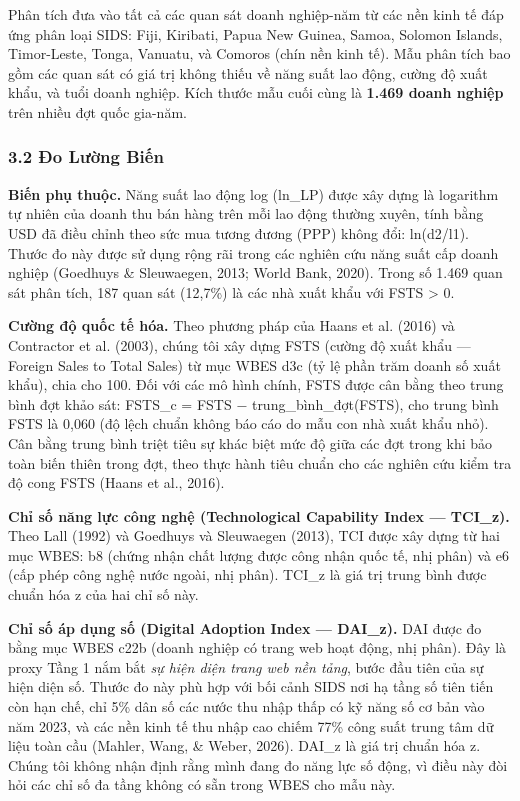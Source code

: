 \documentclass[12pt,a4paper]{article}
\begin{document}
Phân tích đưa vào tất cả các quan sát doanh nghiệp-năm từ các nền kinh
tế đáp ứng phân loại SIDS: Fiji, Kiribati, Papua New Guinea, Samoa,
Solomon Islands, Timor-Leste, Tonga, Vanuatu, và Comoros (chín nền kinh
tế). Mẫu phân tích bao gồm các quan sát có giá trị không thiếu về năng
suất lao động, cường độ xuất khẩu, và tuổi doanh nghiệp. Kích thước mẫu
cuối cùng là \textbf{1.469 doanh nghiệp} trên nhiều đợt quốc gia-năm.

\hypertarget{32-ux111o-lux1b0ux1eddng-biux1ebfn}{%
\subsubsection{3.2 Đo Lường
Biến}\label{32-ux111o-lux1b0ux1eddng-biux1ebfn}}

\textbf{Biến phụ thuộc.} Năng suất lao động log (ln\_LP) được xây dựng
là logarithm tự nhiên của doanh thu bán hàng trên mỗi lao động thường
xuyên, tính bằng USD đã điều chỉnh theo sức mua tương đương (PPP) không
đổi: ln(d2/l1). Thước đo này được sử dụng rộng rãi trong các nghiên cứu
năng suất cấp doanh nghiệp (Goedhuys \& Sleuwaegen, 2013; World Bank,
2020). Trong số 1.469 quan sát phân tích, 187 quan sát (12,7\%) là các
nhà xuất khẩu với FSTS \textgreater{} 0.

\textbf{Cường độ quốc tế hóa.} Theo phương pháp của Haans et al. (2016)
và Contractor et al. (2003), chúng tôi xây dựng FSTS (cường độ xuất khẩu
--- Foreign Sales to Total Sales) từ mục WBES d3c (tỷ lệ phần trăm doanh
số xuất khẩu), chia cho 100. Đối với các mô hình chính, FSTS được cân
bằng theo trung bình đợt khảo sát: FSTS\_c = FSTS −
trung\_bình\_đợt(FSTS), cho trung bình FSTS là 0,060 (độ lệch chuẩn
không báo cáo do mẫu con nhà xuất khẩu nhỏ). Cân bằng trung bình triệt
tiêu sự khác biệt mức độ giữa các đợt trong khi bảo toàn biến thiên
trong đợt, theo thực hành tiêu chuẩn cho các nghiên cứu kiểm tra độ cong
FSTS (Haans et al., 2016).

\textbf{Chỉ số năng lực công nghệ (Technological Capability Index ---
TCI\_z).} Theo Lall (1992) và Goedhuys và Sleuwaegen (2013), TCI được
xây dựng từ hai mục WBES: b8 (chứng nhận chất lượng được công nhận quốc
tế, nhị phân) và e6 (cấp phép công nghệ nước ngoài, nhị phân). TCI\_z là
giá trị trung bình được chuẩn hóa z của hai chỉ số này.

\textbf{Chỉ số áp dụng số (Digital Adoption Index --- DAI\_z).} DAI được
đo bằng mục WBES c22b (doanh nghiệp có trang web hoạt động, nhị phân).
Đây là proxy Tầng 1 nắm bắt \emph{sự hiện diện trang web nền tảng}, bước
đầu tiên của sự hiện diện số. Thước đo này phù hợp với bối cảnh SIDS nơi
hạ tầng số tiên tiến còn hạn chế, chỉ 5\% dân số các nước thu nhập thấp
có kỹ năng số cơ bản vào năm 2023, và các nền kinh tế thu nhập cao chiếm
77\% công suất trung tâm dữ liệu toàn cầu (Mahler, Wang, \& Weber,
2026). DAI\_z là giá trị chuẩn hóa z. Chúng tôi không nhận định rằng
mình đang đo năng lực số động, vì điều này đòi hỏi các chỉ số đa tầng
không có sẵn trong WBES cho mẫu này.
\end{document}

